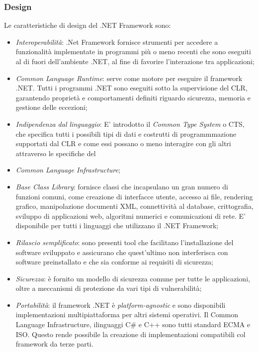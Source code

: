 \subsubsection{Design}
Le caratteristiche di design del .NET Framework sono:
\begin{itemize}
\item \emph{Interoperabilità}: .Net Framework fornisce strumenti per accedere a funzionalità implementate in programmi più o meno recenti che sono eseguiti al di fuori dell'ambiente .NET, al fine di favorire l'interazione tra applicazioni;
\item \emph{Common Language Runtime}: serve come motore per eseguire il framework .NET. Tutti i programmi .NET sono eseguiti sotto la supervisione del CLR, garantendo proprietà e comportamenti definiti riguardo sicurezza, memoria e gestione delle eccezioni;
\item \emph{Indipendenza dal linguaggio}: E' introdotto il \emph{Common Type System} o CTS, che specifica tutti i possibili tipi di dati e costrutti di programmmazione supportati dal CLR e come essi possano o meno interagire con gli altri attraverso le specifiche del \item \emph{Common Language Infrastructure};
\item \emph{Base Class Library}: fornisce classi che incapsulano un gran numero di funzioni comuni, come creazione di interfacce utente, accesso ai file, rendering grafico, manipolazione documenti XML, connettività al database, crittografia, sviluppo di applicazioni web, algoritmi numerici e comunicazioni di rete. E' disponibile per tutti i linguaggi che utilizzano il .NET Framework;
\item \emph{Rilascio semplificato}: sono presenti tool che facilitano l'installazione del software sviluppato e assicurano che quest'ultimo non interferisca con software preinstallato e che sia conforme ai requisiti di sicurezza;
\item \emph{Sicurezza}: è fornito un modello di sicurezza comune per tutte le applicazioni, oltre a meccanismi di protezione da vari tipi di vulnerabilità;
\item \emph{Portabilità}: il framework .NET è \emph{platform-agnostic} e sono disponibili implementazioni multipiattaforma per altri sistemi operativi. Il Common Language Infrastructure, ilinguaggi C\# e C++ sono tutti standard ECMA e ISO. Questo rende possibile la creazione di implementazioni compatibili col framework da terze parti.
\end{itemize}


